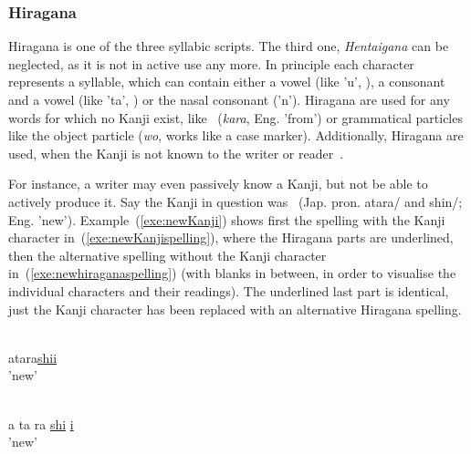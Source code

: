 \subsubsection{Hiragana }
\label{sec:hiragana}

Hiragana is one of the three syllabic scripts. The third one, 
\emph{Hentaigana} can be neglected, as it is not in active use any more. %
In principle each character represents a syllable, which can contain either a 
vowel (like 'u', ), a consonant and a vowel (like 'ta', ) or the 
nasal consonant  ('n').
Hiragana are used for any words for which no Kanji exist, like 
~(\emph{kara}, Eng. 'from') or grammatical particles like the object 
particle  (\emph{wo}, works like a case marker).
Additionally, Hiragana are used, when the Kanji is not known to the writer or 
reader~. 

For instance, a writer may even passively know a Kanji, but not be able
to actively produce it. Say the Kanji in question was ~(Jap. pron. 
atara/ and shin/; Eng. 'new'). Example~(\ref{exe:newKanji})
shows first the spelling with the Kanji character 
in~(\ref{exe:newKanjispelling}), where the Hiragana parts are underlined,
then the alternative spelling without the Kanji character 
in~(\ref{exe:newhiraganaspelling}) (with blanks in between, in order to visualise
the individual characters and their readings). The underlined last part is 
identical, just the Kanji character has been replaced with an alternative 
Hiragana spelling.
\begin{exe}
\ex \label{exe:newKanji}
\begin{xlist}
\ex \label{exe:newKanjispelling}
\gll {}\underline{} \\
atara\underline{shii} \\
\trans 'new'

\ex \label{exe:newhiraganaspelling}
\gll {}   \underline{} \underline{} \\
a ta ra \underline{shi} \underline{i} \\
\trans 'new'
\end{xlist}
\end{exe}

